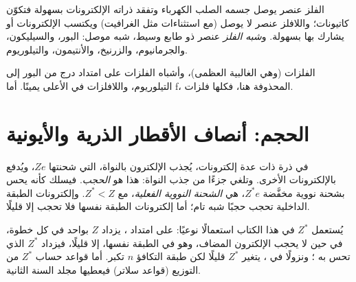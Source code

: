 \begin{definition}\label{def:b1:periodicity:metalloid}
الفلز عنصر يوصل جسمه الصلب الكهرباء وتفقد ذراته الإلكترونات بسهولة
فتكوّن كاتيونات؛ واللافلز عنصر لا يوصل (مع استثناءات مثل الغرافيت)
ويكتسب الإلكترونات أو يشارك بها بسهولة. و\emph{شبه الفلز}
عنصر ذو طابع وسيط، شبه موصل: البور، والسيليكون،
والجرمانيوم، والزرنيخ، والأنتيمون، والتيلوريوم.
\end{definition}

\begin{omfigure}
\omperiodictable[colour=metals, legend, f block=false]

{\small الفلزات (وهي الغالبية العظمى)، وأشباه الفلزات على امتداد درج من
البور إلى التيلوريوم، واللافلزات في الأعلى يمينًا. أما  f،
المحذوفة هنا، فكلها فلزات.}
\end{omfigure}

\section{الحجم: أنصاف الأقطار الذرية والأيونية}

\begin{definition}\label{def:b1:periodicity:screening}
في ذرة ذات عدة إلكترونات، يُجذب الإلكترون بالنواة، التي شحنتها $Ze$،
ويُدفع بالإلكترونات الأخرى. وتلغي  جزءًا من جذب
النواة: هذا هو \emph{الحجب}. فيسلك  كأنه
يحس بشحنة نووية مخفَّضة $Z^{*}e$، هي \emph{الشحنة النووية
الفعلية}، مع $Z^{*} < Z$. وإلكترونات
الطبقة الداخلية تحجب حجبًا شبه تام؛ أما إلكترونات الطبقة نفسها
فلا تحجب إلا قليلًا.
\end{definition}

\begin{remark}\label{rem:b1:periodicity:slater}
يُستعمل $Z^{*}$ في هذا الكتاب استعمالًا نوعيًا: على امتداد ، يزداد
$Z$ بواحد في كل خطوة، في حين لا يحجب الإلكترون المضاف، وهو في الطبقة
نفسها، إلا قليلًا، فيزداد $Z^{*}$ الذي تحس به ؛ ونزولًا
في ، يتغير $Z^{*}$ قليلًا لكن طبقة التكافؤ
$n$ تكبر. أما قواعد حساب $Z^{*}$ من التوزيع (قواعد سلاتر) فيعطيها
مجلد السنة الثانية.
\end{remark}

